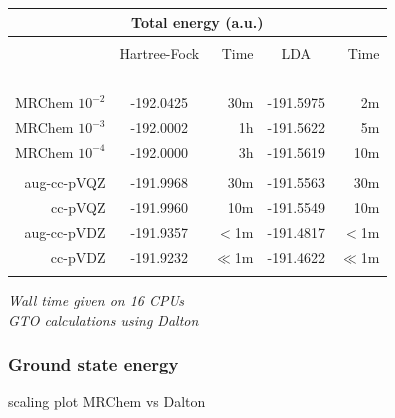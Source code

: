 \begin{frame}
\begin{table}
    \centering
    \begin{tabular}{r|cr|cr}
    \multicolumn{5}{c}{\textbf{Total energy (a.u.)}}\\
    \hline               
    \hline               
                     &               &               &               &               \\
                     &Hartree-Fock   &Time           &LDA            &Time           \\
    \hspace{20mm}\   &\hspace{20mm}\ &\hspace{05mm}\ &\hspace{20mm}\ &\hspace{05mm}\ \\
    MRChem $10^{-2}$ & -192.0425     &  30m          & -191.5975     &   2m          \\
    MRChem $10^{-3}$ & -192.0002     &   1h          & -191.5622     &   5m          \\
    MRChem $10^{-4}$ & -192.0000     &   3h          & -191.5619     &  10m          \\
                     &               &               &               &               \\
    aug-cc-pVQZ      & -191.9968     &  30m          & -191.5563     &  30m          \\
        cc-pVQZ      & -191.9960     &  10m          & -191.5549     &  10m          \\
    aug-cc-pVDZ      & -191.9357     &  $<$1m        & -191.4817     &  $<$1m        \\
        cc-pVDZ      & -191.9232     &  $\ll$1m      & -191.4622     &  $\ll$1m      \\
                     &               &               &               &               \\
    \hline
    \hline
    \end{tabular}
\end{table}

\centering
\it{Wall time given on 16 CPUs}\\
\it{GTO calculations using Dalton}

\end{frame}

\begin{frame}
    \frametitle{Ground state energy}
    scaling plot MRChem vs Dalton
\end{frame}


